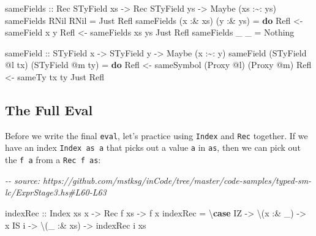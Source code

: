 \documentclass[]{article}
\newenvironment{Shaded}{}{}
\newcommand{\CommentTok}[1]{\textcolor[rgb]{0.38,0.63,0.69}{\textit{#1}}}
\newcommand{\DataTypeTok}[1]{\textcolor[rgb]{0.56,0.13,0.00}{#1}}
\newcommand{\KeywordTok}[1]{\textcolor[rgb]{0.00,0.44,0.13}{\textbf{#1}}}
\newcommand{\NormalTok}[1]{#1}
\newcommand{\OperatorTok}[1]{\textcolor[rgb]{0.40,0.40,0.40}{#1}}
\newcommand{\OtherTok}[1]{\textcolor[rgb]{0.00,0.44,0.13}{#1}}
\begin{document}
\begin{Shaded}
\begin{Highlighting}[]
\OtherTok{sameFields ::} \DataTypeTok{Rec} \DataTypeTok{STyField}\NormalTok{ xs }\OtherTok{{-}\textgreater{}} \DataTypeTok{Rec} \DataTypeTok{STyField}\NormalTok{ ys }\OtherTok{{-}\textgreater{}} \DataTypeTok{Maybe}\NormalTok{ (xs }\OperatorTok{:\textasciitilde{}:}\NormalTok{ ys)}
\NormalTok{sameFields }\DataTypeTok{RNil} \DataTypeTok{RNil} \OtherTok{=} \DataTypeTok{Just} \DataTypeTok{Refl}
\NormalTok{sameFields (x }\OperatorTok{:\&}\NormalTok{ xs) (y }\OperatorTok{:\&}\NormalTok{ ys) }\OtherTok{=} \KeywordTok{do}
  \DataTypeTok{Refl} \OtherTok{\textless{}{-}}\NormalTok{ sameField x y}
  \DataTypeTok{Refl} \OtherTok{\textless{}{-}}\NormalTok{ sameFields xs ys}
  \DataTypeTok{Just} \DataTypeTok{Refl}
\NormalTok{sameFields \_ \_ }\OtherTok{=} \DataTypeTok{Nothing}

\OtherTok{sameField ::} \DataTypeTok{STyField}\NormalTok{ x }\OtherTok{{-}\textgreater{}} \DataTypeTok{STyField}\NormalTok{ y }\OtherTok{{-}\textgreater{}} \DataTypeTok{Maybe}\NormalTok{ (x }\OperatorTok{:\textasciitilde{}:}\NormalTok{ y)}
\NormalTok{sameField (}\DataTypeTok{STyField} \OperatorTok{@}\NormalTok{l tx) (}\DataTypeTok{STyField} \OperatorTok{@}\NormalTok{m ty) }\OtherTok{=} \KeywordTok{do}
    \DataTypeTok{Refl} \OtherTok{\textless{}{-}}\NormalTok{ sameSymbol (}\DataTypeTok{Proxy} \OperatorTok{@}\NormalTok{l) (}\DataTypeTok{Proxy} \OperatorTok{@}\NormalTok{m)}
    \DataTypeTok{Refl} \OtherTok{\textless{}{-}}\NormalTok{ sameTy tx ty}
    \DataTypeTok{Just} \DataTypeTok{Refl}
\end{Highlighting}
\end{Shaded}

\subsection{The Full Eval}\label{the-full-eval}

Before we write the final \texttt{eval}, let's practice using \texttt{Index} and
\texttt{Rec} together. If we have an index \texttt{Index\ as\ a} that picks out
a value \texttt{a} in \texttt{as}, then we can pick out the \texttt{f\ a} from a
\texttt{Rec\ f\ as}:

\begin{Shaded}
\begin{Highlighting}[]
\CommentTok{{-}{-} source: https://github.com/mstksg/inCode/tree/master/code{-}samples/typed{-}sm{-}lc/ExprStage3.hs\#L60{-}L63}

\OtherTok{indexRec ::} \DataTypeTok{Index}\NormalTok{ xs x }\OtherTok{{-}\textgreater{}} \DataTypeTok{Rec}\NormalTok{ f xs }\OtherTok{{-}\textgreater{}}\NormalTok{ f x}
\NormalTok{indexRec }\OtherTok{=}\NormalTok{ \textbackslash{}}\KeywordTok{case}
  \DataTypeTok{IZ} \OtherTok{{-}\textgreater{}}\NormalTok{ \textbackslash{}(x }\OperatorTok{:\&}\NormalTok{ \_) }\OtherTok{{-}\textgreater{}}\NormalTok{ x}
  \DataTypeTok{IS}\NormalTok{ i }\OtherTok{{-}\textgreater{}}\NormalTok{ \textbackslash{}(\_ }\OperatorTok{:\&}\NormalTok{ xs) }\OtherTok{{-}\textgreater{}}\NormalTok{ indexRec i xs}
\end{Highlighting}
\end{Shaded}
\end{document}
